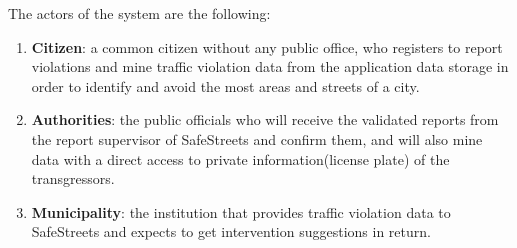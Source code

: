 The actors of the system are the following:
\begin{enumerate}
	\item \textbf{Citizen}: a common citizen without any public office, who registers to report violations and mine traffic violation data from the application data storage in order to identify and avoid the most 	 areas and streets of a city.
	\item\textbf{Authorities}: the public officials who will receive the validated reports from the report supervisor of SafeStreets and confirm them, and will also mine data with a direct access to private information(license plate) of the transgressors.
	\item \textbf{Municipality}: the institution that provides traffic violation data to SafeStreets and expects to get intervention suggestions in return.
\end{enumerate}